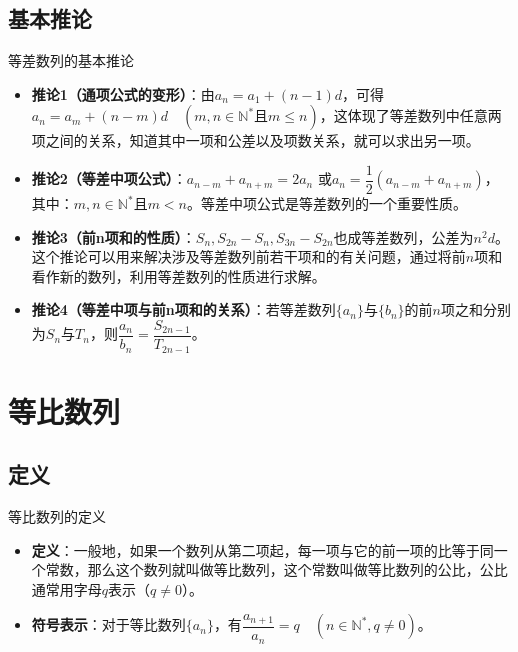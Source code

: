 \documentclass[aspectratio=169]{ctexbeamer} %
\begin{document}
\subsection{基本推论}
\begin{frame}{等差数列的基本推论}
\begin{itemize}
\item \textbf{推论1（通项公式的变形）}：由$a_n = a_1 + (n - 1)d$，可得$a_n = a_m + (n - m)d\quad(m, n \in \mathbb{N}^* \text{且} m \leq n)$，这体现了等差数列中任意两项之间的关系，知道其中一项和公差以及项数关系，就可以求出另一项。
\item \textbf{推论2（等差中项公式）}：$a_{n-m} + a_{n+m} = 2a_n$ 或$a_n = \dfrac{1}{2}(a_{n-m} + a_{n+m})$，其中：$m, n \in \mathbb{N}^* \text{且} m < n$。等差中项公式是等差数列的一个重要性质。
\item \textbf{推论3（前n项和的性质）}：$S_n, S_{2n} - S_n, S_{3n} - S_{2n}$也成等差数列，公差为$n^2 d$。这个推论可以用来解决涉及等差数列前若干项和的有关问题，通过将前$n$项和看作新的数列，利用等差数列的性质进行求解。
\item \textbf{推论4（等差中项与前n项和的关系）}：若等差数列$\{a_n\}$与$\{b_n\}$的前$n$项之和分别为$S_n$与$T_n$，则$\dfrac{a_n}{b_n} =\dfrac{S_{2n-1}}{T_{2n-1}}$。
\end{itemize}
\end{frame}

\section{等比数列}
\subsection{定义}
\begin{frame}{等比数列的定义}
\begin{itemize}
\item \textbf{定义}：一般地，如果一个数列从第二项起，每一项与它的前一项的比等于同一个常数，那么这个数列就叫做等比数列，这个常数叫做等比数列的公比，公比通常用字母$q$表示（$q \neq 0$）。
\item \textbf{符号表示}：对于等比数列$\{a_n\}$，有$\dfrac{a_{n+1}}{a_{n}} = q\quad(n \in \mathbb{N}^*, q \neq 0)$。
\end{itemize}
\end{frame}
\end{document}

